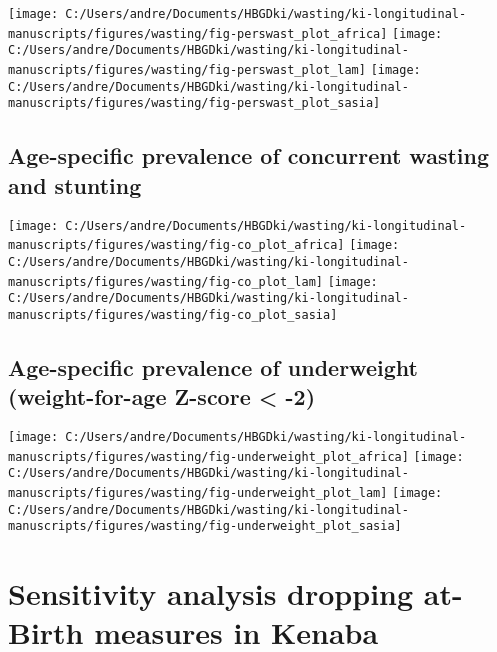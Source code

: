 \documentclass[
  9pt,
]{book}
\begin{document}
\texttt{[image: C:/Users/andre/Documents/HBGDki/wasting/ki-longitudinal-manuscripts/figures/wasting/fig-perswast\_plot\_africa]}
\texttt{[image: C:/Users/andre/Documents/HBGDki/wasting/ki-longitudinal-manuscripts/figures/wasting/fig-perswast\_plot\_lam]}
\texttt{[image: C:/Users/andre/Documents/HBGDki/wasting/ki-longitudinal-manuscripts/figures/wasting/fig-perswast\_plot\_sasia]}

\hypertarget{age-specific-prevalence-of-concurrent-wasting-and-stunting-1}{%
\section{Age-specific prevalence of concurrent wasting and stunting}\label{age-specific-prevalence-of-concurrent-wasting-and-stunting-1}}

\texttt{[image: C:/Users/andre/Documents/HBGDki/wasting/ki-longitudinal-manuscripts/figures/wasting/fig-co\_plot\_africa]}
\texttt{[image: C:/Users/andre/Documents/HBGDki/wasting/ki-longitudinal-manuscripts/figures/wasting/fig-co\_plot\_lam]}
\texttt{[image: C:/Users/andre/Documents/HBGDki/wasting/ki-longitudinal-manuscripts/figures/wasting/fig-co\_plot\_sasia]}

\hypertarget{age-specific-prevalence-of-underweight-weight-for-age-z-score--2}{%
\section{Age-specific prevalence of underweight (weight-for-age Z-score \textless{} -2)}\label{age-specific-prevalence-of-underweight-weight-for-age-z-score--2}}

\texttt{[image: C:/Users/andre/Documents/HBGDki/wasting/ki-longitudinal-manuscripts/figures/wasting/fig-underweight\_plot\_africa]}
\texttt{[image: C:/Users/andre/Documents/HBGDki/wasting/ki-longitudinal-manuscripts/figures/wasting/fig-underweight\_plot\_lam]}
\texttt{[image: C:/Users/andre/Documents/HBGDki/wasting/ki-longitudinal-manuscripts/figures/wasting/fig-underweight\_plot\_sasia]}

\hypertarget{no-kenaba}{%
\chapter{Sensitivity analysis dropping at-Birth measures in Kenaba}\label{no-kenaba}}

\raggedright
\end{document}
